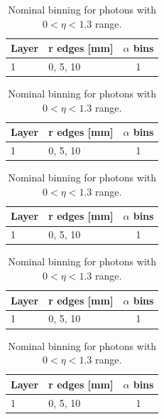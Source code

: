 \begin{table}[h]
\centering
\caption{Nominal binning for photons with $0 < \eta < 1.3$ range.}
\label{tab:d1-binning}
\begin{tabular}{l|l|c}
\toprule
Layer & r edges [mm] & $\alpha$ bins  \\ \midrule
1 & 0, 5, 10 & 1 \\
\bottomrule
\end{tabular}
\end{table}

\begin{table}[h]
\centering
\caption{Nominal binning for photons with $0 < \eta < 1.3$ range.}
\label{tab:d1-binning}
\begin{tabular}{l|l|c}
\toprule
Layer & r edges [mm] & $\alpha$ bins  \\ \midrule
1 & 0, 5, 10 & 1 \\
\bottomrule
\end{tabular}
\end{table}

\begin{table}[h]
\centering
\caption{Nominal binning for photons with $0 < \eta < 1.3$ range.}
\label{tab:d1-binning}
\begin{tabular}{l|l|c}
\toprule
Layer & r edges [mm] & $\alpha$ bins  \\ \midrule
1 & 0, 5, 10 & 1 \\
\bottomrule
\end{tabular}
\end{table}

\begin{frame}[t]
\begin{table}[h]
\centering
\caption{Nominal binning for photons with $0 < \eta < 1.3$ range.}
\label{tab:d1-binning}
\begin{tabular}{l|l|c}
\toprule
Layer & r edges [mm] & $\alpha$ bins  \\ \midrule
1 & 0, 5, 10 & 1 \\
\bottomrule
\end{tabular}
\end{table}

\end{frame}

\begin{frame}[t]
\begin{table}[h]
\centering
\caption{Nominal binning for photons with $0 < \eta < 1.3$ range.}
\label{tab:d1-binning}
\begin{tabular}{l|l|c}
\toprule
Layer & r edges [mm] & $\alpha$ bins  \\ \midrule
1 & 0, 5, 10 & 1 \\
\bottomrule
\end{tabular}
\end{table}

\end{frame}

